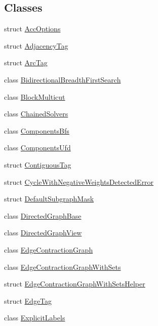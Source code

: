 \subsection*{Classes}
\begin{DoxyCompactItemize}
\item 
struct \hyperlink{structnifty_1_1graph_1_1AccOptions}{Acc\+Options}
\item 
struct \hyperlink{structnifty_1_1graph_1_1AdjacencyTag}{Adjacency\+Tag}
\item 
struct \hyperlink{structnifty_1_1graph_1_1ArcTag}{Arc\+Tag}
\item 
class \hyperlink{classnifty_1_1graph_1_1BidirectionalBreadthFirstSearch}{Bidirectional\+Breadth\+First\+Search}
\item 
class \hyperlink{classnifty_1_1graph_1_1BlockMulticut}{Block\+Multicut}
\item 
class \hyperlink{classnifty_1_1graph_1_1ChainedSolvers}{Chained\+Solvers}
\item 
class \hyperlink{classnifty_1_1graph_1_1ComponentsBfs}{Components\+Bfs}
\item 
class \hyperlink{classnifty_1_1graph_1_1ComponentsUfd}{Components\+Ufd}
\item 
struct \hyperlink{structnifty_1_1graph_1_1ContiguousTag}{Contiguous\+Tag}
\item 
struct \hyperlink{structnifty_1_1graph_1_1CycleWithNegativeWeightsDetectedError}{Cycle\+With\+Negative\+Weights\+Detected\+Error}
\item 
struct \hyperlink{structnifty_1_1graph_1_1DefaultSubgraphMask}{Default\+Subgraph\+Mask}
\item 
class \hyperlink{classnifty_1_1graph_1_1DirectedGraphBase}{Directed\+Graph\+Base}
\item 
class \hyperlink{classnifty_1_1graph_1_1DirectedGraphView}{Directed\+Graph\+View}
\item 
class \hyperlink{classnifty_1_1graph_1_1EdgeContractionGraph}{Edge\+Contraction\+Graph}
\item 
class \hyperlink{classnifty_1_1graph_1_1EdgeContractionGraphWithSets}{Edge\+Contraction\+Graph\+With\+Sets}
\item 
struct \hyperlink{structnifty_1_1graph_1_1EdgeContractionGraphWithSetsHelper}{Edge\+Contraction\+Graph\+With\+Sets\+Helper}
\item 
struct \hyperlink{structnifty_1_1graph_1_1EdgeTag}{Edge\+Tag}
\item 
class \hyperlink{classnifty_1_1graph_1_1ExplicitLabels}{Explicit\+Labels}

\end{DoxyCompactItemize}
